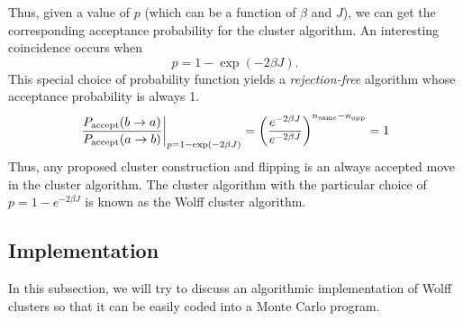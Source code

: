\documentclass[../thesis_main.tex]{subfiles}
\begin{document}
Thus, given a value of $p$ (which can be a function of $\beta$ and $J$), we can get the corresponding acceptance probability for the cluster algorithm. An interesting coincidence occurs when 
\begin{equation}
    p = 1 - \exp(-2\beta J).
\end{equation}
This special choice of probability function yields a \textit{rejection-free} algorithm whose acceptance probability is always 1. 
\begin{equation}
    \eval{\frac{P_\text{accept}(b \to a)}{P_\text{accept}(a \to b)}}_{p = 1 - \exp(-2\beta J)} = \qty(\frac{e^{-2\beta J}}{e^{-2\beta J}})^{n_\text{same} - n_\text{opp}} = 1
\end{equation}
Thus, any proposed cluster construction and flipping is an always accepted move in the cluster algorithm. The cluster algorithm with the particular choice of $p = 1 - e^{-2\beta J}$ is known as the Wolff cluster algorithm. 

\subsection{Implementation}
In this subsection, we will try to discuss an algorithmic implementation of Wolff clusters so that it can be easily coded into a Monte Carlo program.
\end{document}
